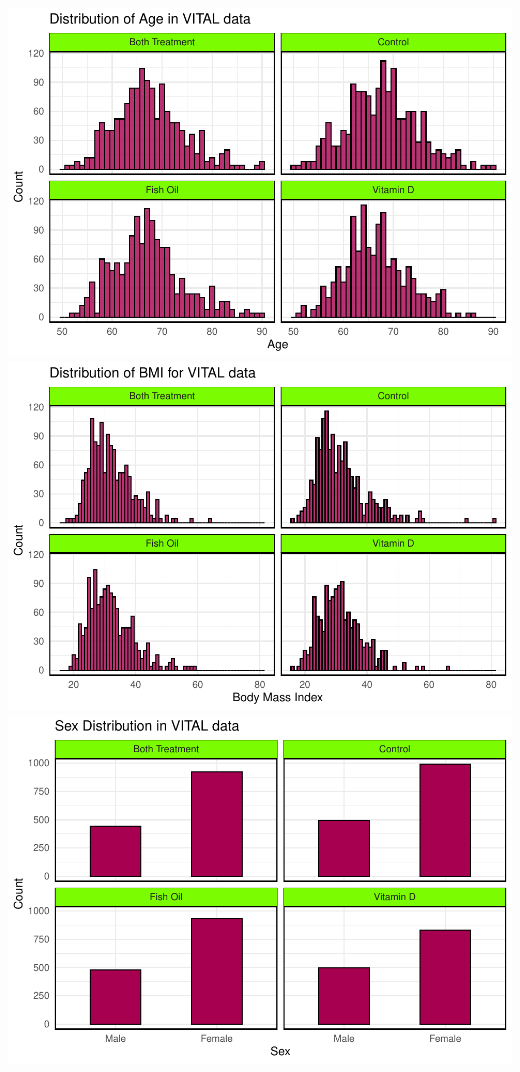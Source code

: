 \documentclass{article}
\newcommand{\pandocbounded}[1]{#1}
\begin{document}
\pandocbounded{\includegraphics[keepaspectratio]{Final_Report_files/figure-latex/unnamed-chunk-6-1.pdf}}
\pandocbounded{\includegraphics[keepaspectratio]{Final_Report_files/figure-latex/unnamed-chunk-6-2.pdf}}
\pandocbounded{\includegraphics[keepaspectratio]{Final_Report_files/figure-latex/unnamed-chunk-6-3.pdf}}
\end{document}
